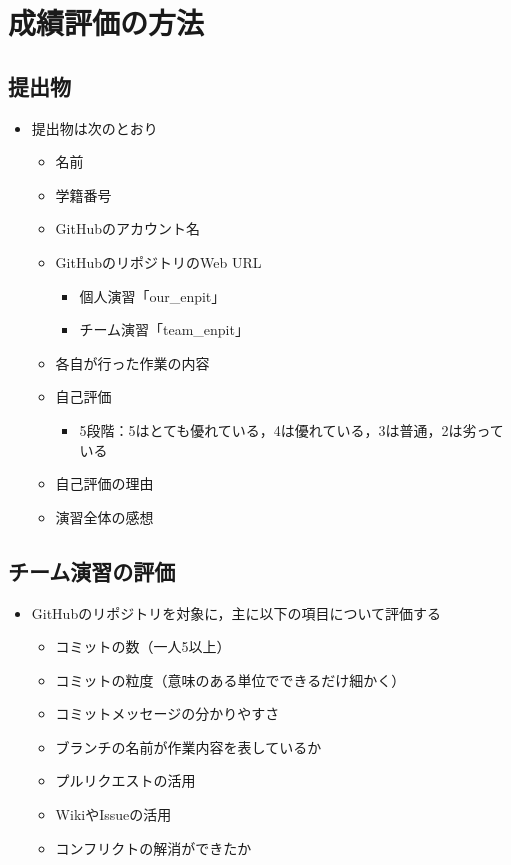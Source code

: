 \documentclass[a4paper,twoside,twocolumn]{bxjsarticle}
\begin{document}
\section{成績評価の方法}
\label{sec-5}
\subsection{提出物}
\label{sec-5-1}
\begin{itemize}
\item 提出物は次のとおり
\begin{itemize}
\item 名前
\item 学籍番号
\item GitHubのアカウント名
\item GitHubのリポジトリのWeb URL
\begin{itemize}
\item 個人演習「our\_enpit」
\item チーム演習「team\_enpit」
\end{itemize}
\item 各自が行った作業の内容
\item 自己評価
\begin{itemize}
\item 5段階：5はとても優れている，4は優れている，3は普通，2は劣っている
\end{itemize}
\item 自己評価の理由
\item 演習全体の感想
\end{itemize}
\end{itemize}

\subsection{チーム演習の評価}
\label{sec-5-2}
\begin{itemize}
\item GitHubのリポジトリを対象に，主に以下の項目について評価する
\begin{itemize}
\item コミットの数（一人5以上）
\item コミットの粒度（意味のある単位でできるだけ細かく）
\item コミットメッセージの分かりやすさ
\item ブランチの名前が作業内容を表しているか
\item プルリクエストの活用
\item WikiやIssueの活用
\item コンフリクトの解消ができたか
\end{itemize}
\end{itemize}
\end{document}
